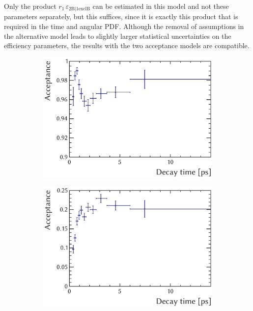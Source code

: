 Only the product $r_\text{1}\, \varepsilon_\text{2B|1exclB}$ can be estimated in this model and not these parameters separately, but this
suffices, since it is exactly this product that is required in the time and angular PDF. Although the removal of assumptions in the
alternative model leads to slightly larger statistical uncertainties on the efficiency parameters, the results with the two acceptance
models are compatible.

\begin{figure}[htbp]
  \centering
  \begin{subfigure}{0.49\textwidth}
    \includegraphics[width=\textwidth]{graphics/analysis/trigTimeAcc_2011_UB}
    \caption{}
    \label{fig:trigAcc_2011_UB}
  \end{subfigure}%
  \hfill%
  \begin{subfigure}{0.49\textwidth}
    \includegraphics[width=\textwidth]{graphics/analysis/trigTimeAcc_2011_exclB}
    \caption{}
    \label{fig:trigAcc_2011_exclB}
  \end{subfigure}


\end{figure}
